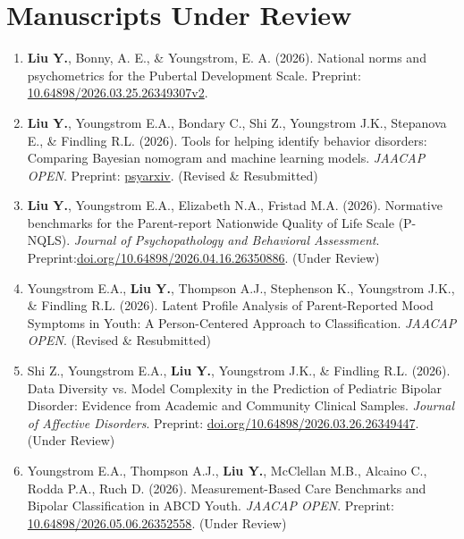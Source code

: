 \documentclass[12pt]{article}
\begin{document}
\section{Manuscripts Under Review}
\begin{enumerate} [left=1em]
    \item \textbf{Liu Y.}, Bonny, A. E., \& Youngstrom, E. A. (2026). National norms and psychometrics for the Pubertal Development Scale. Preprint: \href{https://doi.org/10.64898/2026.03.25.26349307}{10.64898/2026.03.25.26349307v2}. 

    \item \textbf{Liu Y.}, Youngstrom E.A., Bondary C., Shi Z., Youngstrom J.K., Stepanova E., \& Findling R.L. (2026). Tools for helping identify behavior disorders: Comparing Bayesian nomogram and machine learning models. \textit{JAACAP OPEN}. Preprint: \href{https://osf.io/preprints/psyarxiv/4sfjz_v1}{psyarxiv}. (Revised \& Resubmitted)

    \item  \textbf{Liu Y.}, Youngstrom E.A., Elizabeth N.A., Fristad M.A. (2026). Normative benchmarks for the Parent-report Nationwide Quality of Life Scale (P-NQLS). \textit{Journal of Psychopathology and Behavioral Assessment}. Preprint:\href{https://www.medrxiv.org/content/10.64898/2026.04.16.26350886v1}{doi.org/10.64898/2026.04.16.26350886}. (Under Review)
    
    \item Youngstrom E.A., \textbf{Liu Y.}, Thompson A.J., Stephenson K., Youngstrom J.K., \& Findling R.L. (2026). Latent Profile Analysis of Parent-Reported Mood Symptoms in Youth: A Person-Centered Approach to Classification. \textit{JAACAP OPEN}. (Revised \& Resubmitted)

    \item Shi Z., Youngstrom E.A., \textbf{Liu Y.}, Youngstrom J.K., \& Findling R.L. (2026). Data Diversity vs. Model Complexity in the Prediction of Pediatric Bipolar Disorder: Evidence from Academic and Community Clinical Samples. \textit{Journal of Affective Disorders}. Preprint: \href{https://doi.org/10.64898/2026.03.26.26349447}{doi.org/10.64898/2026.03.26.26349447}. (Under Review)

    \item Youngstrom E.A., Thompson A.J., \textbf{Liu Y.}, McClellan M.B., Alcaino C., Rodda P.A., Ruch D. (2026). Measurement-Based Care Benchmarks and Bipolar Classification in ABCD Youth. \textit{JAACAP OPEN}. Preprint: \href{https://doi.org/10.64898/2026.05.06.26352558}{10.64898/2026.05.06.26352558}. (Under Review)
\end{enumerate}
\end{document}

